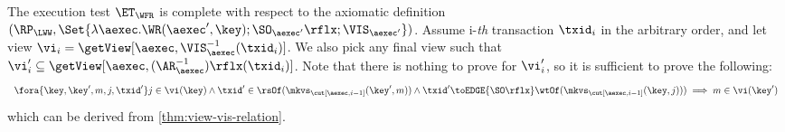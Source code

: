 The execution test $\ET_\WFR$ is complete with respect to the axiomatic definition 
\( (\RP_{\LWW}, \Set{\lambda \aexec. \WR(\aexec', \key) ; \SO_{\aexec'}\rflx ; \VIS_{\aexec'} })\).
Assume i-\emph{th} transaction \( \txid_i \) in the arbitrary order,
and let view \( \vi_{i} = \getView[\aexec, \VIS^{-1}_{\aexec}(\txid_{i})] \).
We also pick any final view such that \( \vi'_{i} \subseteq \getView[\aexec, (\AR^{-1}_{\aexec})\rflx(\txid_{i})] \).
Note that there is nothing to prove for \( \vi'_i \),
so it is sufficient to prove the following:
\[
    \begin{array}{l}
    \fora{\key, \key', m, j, \txid'} j \in \vi(\key)
    \land \txid' \in \rsOf(\mkvs_{\cut[\aexec, i-1]}(\key', m)) \land \txid' {\toEDGE{\SO\rflx}} \wtOf(\mkvs_{\cut[\aexec, i-1]}(\key, j)) ) 
    \implies m \in \vi(\key')
    \end{array}
\]
which can be derived from \cref{thm:view-vis-relation}.
